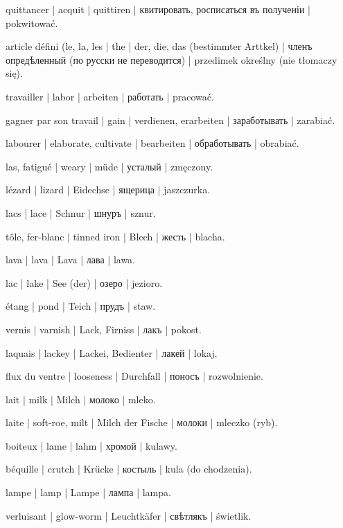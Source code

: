 \begin{outdent}{1em}
quittancer | acquit | quittiren | квитировать, росписаться
въ полученіи | pokwitować.


article défini (le, la, les | the | der, die, das (bestimmter
Arttkel) | членъ опредѣленный (по русски не переводится) | przedimek
określny (nie tłomaczy się).

travailler | labor | arbeiten | работать | pracować.

\uvsubentry{}
gagner par son travail | gain | verdienen, erarbeiten | заработывать | zarabiać.

\uvsubentry{}
labourer | elaborate, cultivate | bearbeiten | обработывать | obrabiać.

las, fatigué | weary | müde | усталый | zmęczony.

lézard | lizard | Eidechse | ящерица | jaszczurka.

lacs | lace | Schnur | шнуръ | sznur.

tôle, fer-blanc | tinned iron | Blech | жесть | blacha.

lava | lava | Lava | лава | lawa.

lac | lake | See (der) | озеро | jezioro.

\uvsubentry{}
étang | pond | Teich | прудъ | staw.

vernis | varnish | Lack, Firniss | лакъ | pokost.

laquais | lackey | Lackei, Bedienter | лакей | lokaj.

flux du ventre | looseness | Durchfall | поносъ | rozwolnienie.

lait | milk | Milch | молоко | mleko.

\uvsubentry{}
laite | soft-roe, milt | Milch der Fische | молоки | mleczko (ryb).

boiteux | lame | lahm | хромой | kulawy.

\uvsubentry{}
béquille | crutch | Krücke | костыль | kula (do chodzenia).

lampe | lamp | Lampe | лампа | lampa.

verluisant | glow-worm | Leuchtkäfer | свѣтлякъ | świetlik.


\end{outdent}
